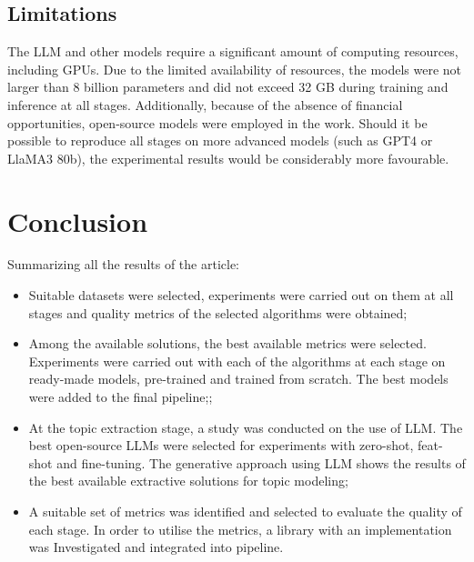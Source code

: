 \documentclass[PMI,VKR]{HSEUniversity}
\begin{document}
\section{Limitations}

The LLM and other models require a significant amount of computing resources, including GPUs. Due to the limited availability of resources, the models were not larger than 8 billion parameters and did not exceed 32 GB during training and inference at all stages. 
Additionally, because of the absence of financial opportunities, open-source models were employed in the work. Should it be possible to reproduce all stages on more advanced models (such as GPT4 or LlaMA3 80b), the experimental results would be considerably more favourable.

\chapter*{Conclusion}

Summarizing all the results of the article:
\begin{itemize}
    \item Suitable datasets were selected, experiments were carried out on them at all stages and quality metrics of the selected algorithms were obtained;
    \item Among the available solutions, the best available metrics were selected. Experiments were carried out with each of the algorithms at each stage on ready-made models, pre-trained and trained from scratch. The best models were added to the final pipeline;;
    \item At the topic extraction stage, a study was conducted on the use of LLM. The best open-source LLMs were selected for experiments with zero-shot, feat-shot and fine-tuning. The generative approach using LLM shows the results of the best available extractive solutions for topic modeling;
    \item A suitable set of metrics was identified and selected to evaluate the quality of each stage. In order to utilise the metrics, a library with an implementation was Investigated and integrated into pipeline.
\end{itemize}

\putbibliography
\end{document}
